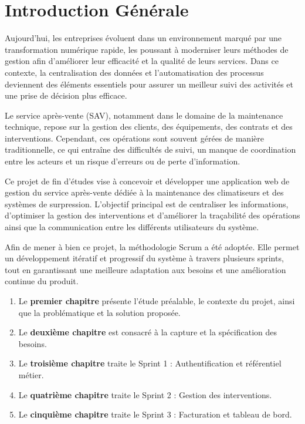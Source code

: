 \chapter*{Introduction Générale}
\mtcaddchapter

Aujourd’hui, les entreprises évoluent dans un environnement marqué par une transformation numérique rapide, les poussant à moderniser leurs méthodes de gestion afin d’améliorer leur efficacité et la qualité de leurs services. Dans ce contexte, la centralisation des données et l’automatisation des processus deviennent des éléments essentiels pour assurer un meilleur suivi des activités et une prise de décision plus efficace.

Le service après-vente (SAV), notamment dans le domaine de la maintenance technique, repose sur la gestion des clients, des équipements, des contrats et des interventions. Cependant, ces opérations sont souvent gérées de manière traditionnelle, ce qui entraîne des difficultés de suivi, un manque de coordination entre les acteurs et un risque d’erreurs ou de perte d’information.

Ce projet de fin d’études vise à concevoir et développer une application web de gestion du service après-vente dédiée à la maintenance des climatiseurs et des systèmes de surpression. L’objectif principal est de centraliser les informations, d’optimiser la gestion des interventions et d’améliorer la traçabilité des opérations ainsi que la communication entre les différents utilisateurs du système.

Afin de mener à bien ce projet, la méthodologie Scrum a été adoptée. Elle permet un développement itératif et progressif du système à travers plusieurs sprints, tout en garantissant une meilleure adaptation aux besoins et une amélioration continue du produit.

\begin{enumerate}
    \item Le \textbf{premier chapitre} présente l'étude préalable, le contexte du projet, ainsi que
          la problématique et la solution proposée.
    \item Le \textbf{deuxième chapitre} est consacré à la capture et la spécification des besoins.
    \item Le \textbf{troisième chapitre} traite le Sprint 1 : Authentification et référentiel métier.
    \item Le \textbf{quatrième chapitre} traite le Sprint 2 : Gestion des interventions.
    \item Le \textbf{cinquième chapitre} traite le Sprint 3 : Facturation et tableau de bord.
\end{enumerate}

\newpage

